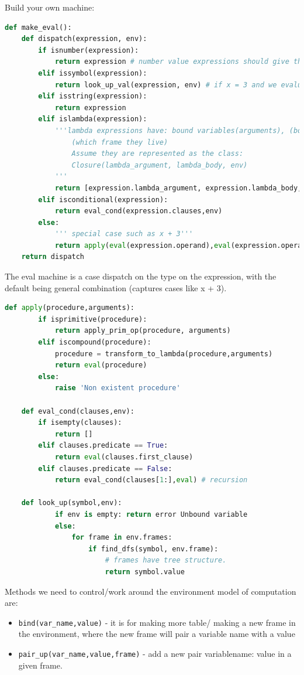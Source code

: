 \documentclass[a4paper,twoside]{article}
\numberwithin{equation}{section}
\begin{document}
Build your own machine:
\begin{lstlisting}[language=Python]
def make_eval():
    def dispatch(expression, env):
        if isnumber(expression):
            return expression # number value expressions should give themselves 3 -> 3
        elif issymbol(expression):
            return look_up_val(expression, env) # if x = 3 and we evaluate expression x -> 3
        elif isstring(expression):
            return expression
        elif islambda(expression):
            '''lambda expressions have: bound variables(arguments), (body), and environment
                (which frame they live)
                Assume they are represented as the class:
                Closure(lambda_argument, lambda_body, env)
            '''
            return [expression.lambda_argument, expression.lambda_body, expression.env]
        elif isconditional(expression):
            return eval_cond(expression.clauses,env)
        else:
            ''' special case such as x + 3'''
            return apply(eval(expression.operand),eval(expression.operators))
    return dispatch
\end{lstlisting}
The eval machine is a case dispatch on the type on the expression, with the default being general
combination (captures cases like x + 3).
\begin{lstlisting}[language=Python]
    def apply(procedure,arguments):
        if isprimitive(procedure):
            return apply_prim_op(procedure, arguments)
        elif iscompound(procedure):
            procedure = transform_to_lambda(procedure,arguments)
            return eval(procedure)
        else:
            raise 'Non existent procedure'

    def eval_cond(clauses,env):
        if isempty(clauses):
            return []
        elif clauses.predicate == True:
            return eval(clauses.first_clause)
        elif clauses.predicate == False:
            return eval_cond(clauses[1:],eval) # recursion

    def look_up(symbol,env):
            if env is empty: return error Unbound variable
            else:
                for frame in env.frames:
                    if find_dfs(symbol, env.frame):
                        # frames have tree structure.
                        return symbol.value
\end{lstlisting}

Methods we need to control/work around the environment model of computation are:
\begin{itemize}
    \item \texttt{bind(var\_name,value)} - it is for making more table/ making a new frame in the environment, where
    the new frame will pair a variable name with  a value
    \item \texttt{pair\_up(var\_name,value,frame)} - add a new pair variablename: value in a given frame.
\end{itemize}
\end{document}
